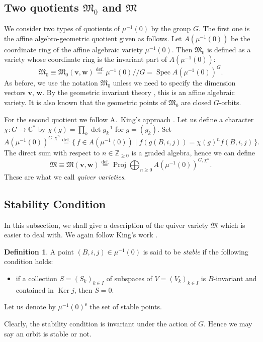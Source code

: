 \documentclass[12pt]{amsart}
\def\Bbb{\mathbb}
\def\frak{\mathfrak}
\theoremstyle{definition}
\newtheorem{Definition}[equation]{Definition}
\theoremstyle{remark}
\numberwithin{equation}{subsection}
\newcommand{\defeq}{\overset{\operatorname{\scriptstyle def.}}{=}}
\newcommand{\C}{{\Bbb C}}
\newcommand{\Spec}{\operatorname{Spec}\nolimits}
\newcommand{\Proj}{\operatorname{Proj}\nolimits}
\newcommand{\Ker}{\operatorname{Ker}}
\newcommand{\M}{{\frak M}} %
\newcommand{\dslash}{/\!\!/} %
\newcommand{\bv}{{\mathbf v}} %
\newcommand{\bw}{{\mathbf w}} %
\begin{document}
\subsection{Two quotients $\M_0$ and $\M$}\label{subsec:twoquot}

We consider two types of quotients of $\mu^{-1}(0)$ by the group $G$.
The first one is the affine algebro-geometric quotient given as
follows.  Let $A(\mu^{-1}(0))$ be the coordinate ring of the affine
algebraic variety $\mu^{-1}(0)$.  Then $\M_0$ is defined as a variety
whose coordinate ring is the invariant part of $A(\mu^{-1}(0))$:
\begin{equation}
  \M_0 \equiv \M_0(\bv,\bw) \defeq
  \mu^{-1}(0)\dslash G = \Spec A(\mu^{-1}(0))^{G}.
\end{equation}
As before, we use the notation $\M_0$ unless we need to specify the
dimension vectors $\bv$, $\bw$.
By the geometric invariant theory \cite{GIT}, this is an affine
algebraic variety.
It is also known that the geometric points of $\M_0$ are closed $G$-orbits.

For the second quotient we follow A.~King's approach \cite{King}.
Let us define a character $\chi\colon G\to \C^*$ by
$\chi(g) = \prod_k \det g_k^{-1}$ for $g = (g_k)$.
Set
\begin{equation*}
  A(\mu^{-1}(0))^{G, \chi^n} \defeq
  \{\, f\in A(\mu^{-1}(0)) \mid f(g (B, i, j)) = \chi(g)^n f(B, i, j)
  \,\} .
\end{equation*}
The direct sum with respect to $n\in\Bbb Z_{\ge 0}$ is a graded
algebra, hence we can define
\begin{equation}
  \M \equiv \M(\bv,\bw) \defeq
  \Proj \bigoplus_{n\ge 0} A(\mu^{-1}(0))^{G, \chi^n}.
\end{equation}
These are what we call {\it quiver varieties}.
%
\subsection{Stability Condition}\label{subsec:stability}
%
In this subsection, we shall give a description of the quiver variety $\M$
which is easier to deal with.
We again follow King's work \cite{King}.

\begin{Definition}\label{def:stable}
A point $(B, i, j) \in \mu^{-1}(0)$ is said to be {\it stable\/} if 
the following condition holds:
\begin{itemize}
\item[] if a collection $S = (S_k)_{k\in I}$ of subspaces of $V =
(V_k)_{k\in I}$ is $B$-invariant and contained in 
$\Ker j$, then $S = 0$.
\end{itemize}
Let us denote by $\mu^{-1}(0)^{\operatorname{s}}$ the set of stable points.
\end{Definition}
Clearly, the stability condition is invariant under the action of
$G$. Hence we may say an orbit is stable or not.
\end{document}
